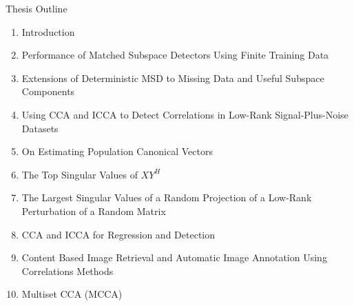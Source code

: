\documentclass[8pt]{beamer}
\begin{document}
\begin{frame}{Thesis Outline}
  \addtocounter{framenumber}{-1}
  \begin{enumerate}
  \item \textcolor{textlightgray}{Introduction}
  \item \textcolor{textlightgray}{Performance of Matched Subspace Detectors Using Finite
      Training Data} 
  \item \textcolor{textlightgray}{Extensions of Deterministic MSD to Missing Data and
      Useful Subspace Components} 
  \item {\color{texthigh}Using CCA and ICCA to Detect Correlations in Low-Rank Signal-Plus-Noise Datasets}
  \item \textcolor{textred}{On Estimating Population Canonical Vectors}
  \item \textcolor{textred}{The Top Singular Values of $XY^H$}
  \item \textcolor{textred}{The Largest Singular Values of a Random Projection of a Low-Rank Perturbation of a Random Matrix} 
  \item \textcolor{textlightgray}{CCA and ICCA for Regression and Detection} 
  \item \textcolor{textred}{Content Based Image Retrieval and Automatic Image Annotation Using Correlations Methods}
  \item \textcolor{textred}{Multiset CCA (MCCA)}
  \end{enumerate}

\end{frame}
\end{document}
